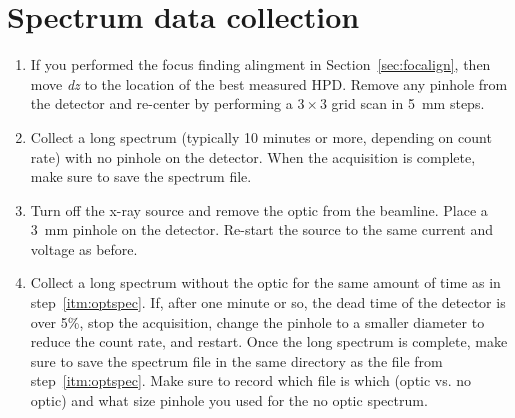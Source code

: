 \section{Spectrum data collection\label{sec:spec-collect}}

\begin{enumerate}

\item If you performed the focus finding alingment in
  Section~\ref{sec:focalign}, then move \textit{dz} to the location of the best
  measured HPD. Remove any pinhole from the detector and re-center by performing
  a $3\times3$ grid scan in 5~mm steps.

\item \label{itm:optspec} Collect a long spectrum (typically 10 minutes or more,
  depending on count rate) with no pinhole on the detector. When the acquisition
  is complete, make sure to save the spectrum file.

\item Turn off the x-ray source and remove the optic from the beamline. Place a
  3~mm pinhole on the detector. Re-start the source to the same current and
  voltage as before.

\item Collect a long spectrum without the optic for the same amount of time as
  in step~\ref{itm:optspec}. If, after one minute or so, the dead time of the
  detector is over 5\%, stop the acquisition, change the pinhole to a smaller
  diameter to reduce the count rate, and restart. Once the long spectrum is
  complete, make sure to save the spectrum file in the same directory as the
  file from step~\ref{itm:optspec}. Make sure to record which file is which
  (optic vs. no optic) and what size pinhole you used for the no optic spectrum.

\end{enumerate}


